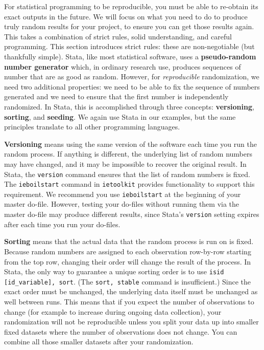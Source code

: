 For statistical programming to be reproducible,
you must be able to re-obtain its exact outputs in the future.\cite{orozco2018make}
We will focus on what you need to do to produce
truly random results for your project,
to ensure you can get those results again.
This takes a combination of strict rules, solid understanding, and careful programming.
This section introduces strict rules:
these are non-negotiable (but thankfully simple).
Stata, like most statistical software, uses a \textbf{pseudo-random number generator}
which, in ordinary research use,
produces sequences of number that are as good as random.
However, for \textit{reproducible} randomization, we need two additional properties:
we need to be able to fix the sequence of numbers generated and
we need to ensure that the first number is independently randomized.
In Stata, this is accomplished through three concepts:
\textbf{versioning}, \textbf{sorting}, and \textbf{seeding}.
We again use Stata in our examples,
but the same principles translate to all other programming languages.

\textbf{Versioning} means using the same version of the software each time you run the random process.
If anything is different, the underlying list of random numbers may have changed,
and it may be impossible to recover the original result.
In Stata, the \texttt{version} command ensures that the list of random numbers is fixed.
The \texttt{ieboilstart} command in \texttt{ietoolkit} provides functionality to support this requirement.
We recommend you use \texttt{ieboilstart} at the beginning of your master do-file.
However, testing your do-files without running them
via the master do-file may produce different results,
since Stata's \texttt{version} setting expires after each time you run your do-files.

\textbf{Sorting} means that the actual data that the random process is run on is fixed.
Because random numbers are assigned to each observation row-by-row starting from
the top row,
changing their order will change the result of the process.
In Stata, the only way to guarantee a unique sorting order is to use
\texttt{isid [id\_variable], sort}.
(The \texttt{sort, stable} command is insufficient.)
Since the exact order must be unchanged,
the underlying data itself must be unchanged as well between runs.
This means that if you expect the number of observations to change
(for example to increase during ongoing data collection),
your randomization will not be reproducible unless you split your data up into
smaller fixed datasets where the number of observations does not change.
You can combine all
those smaller datasets after your randomization.


